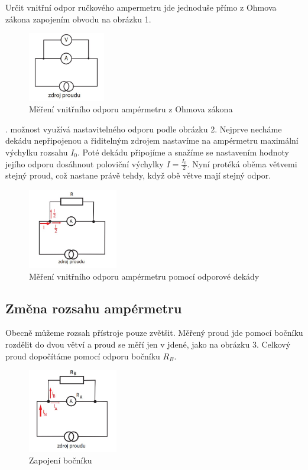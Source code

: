 \documentclass[a4paper,11pt]{article}
\begin{document}
Určit vnitřní odpor ručkového ampermetru jde jednoduše přímo z Ohmova zákona zapojením obvodu na obrázku 1.

\begin{figure}[htpb]
  \centering
  \includegraphics[width=0.3\textwidth]{mereni_voltmetrem.jpg}
  \caption{Měření vnitřního odporu ampérmetru z Ohmova zákona}
\end{figure}

. možnost využívá nastavitelného odporu podle obrázku 2. 
Nejprve necháme dekádu nepřipojenou a řiditelným zdrojem nastavíme na ampérmetru
maximální výchylku rozsahu $I_0$. Poté dekádu připojíme a snažíme se nastavením hodnoty jejího odporu dosáhnout poloviční výchylky $I = \frac{I_0}{2}$. Nyní protéká oběma větvemi stejný proud, což nastane právě tehdy, když obě větve mají stejný odpor.

\begin{figure}[htpb]
  \centering
  \includegraphics[width=0.35\textwidth]{mereni_dekadou.jpg}
  \caption{Měření vnitřního odporu ampérmetru pomocí odporové dekády}
\end{figure}


\subsection{Změna rozsahu ampérmetru}

Obecně můžeme rozsah přístroje pouze zvětšit. Měřený proud jde pomocí bočníku rozdělit do dvou větví a proud se měří jen v jdené, jako na obrázku 3. Celkový proud dopočítáme pomocí odporu bočníku $R_B$.

\begin{figure}[htpb]
  \centering
  \includegraphics[width=0.35\textwidth]{bocnik.jpg}
  \caption{Zapojení bočníku}
\end{figure}
\end{document}
